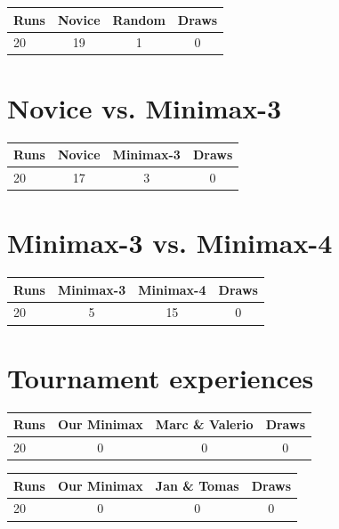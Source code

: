 \documentclass{scrartcl}
\begin{document}
\begin{tabular}{l c c c}
Runs & Novice & Random & Draws \\
\hline
20 & 19 & 1 & 0  \\
\end{tabular}

\section{Novice vs. Minimax-3}

\begin{tabular}{l c c c}
Runs & Novice & Minimax-3 & Draws \\
\hline
20 & 17 & 3 & 0  \\
\end{tabular}

\section{Minimax-3 vs. Minimax-4}

\begin{tabular}{l c c c}
Runs & Minimax-3 & Minimax-4 & Draws \\
\hline
20 & 5 & 15 & 0  \\
\end{tabular}

\section{Tournament experiences}

\begin{tabular}{l c c c}
Runs & Our Minimax & Marc \& Valerio & Draws \\
\hline
20 & 0 & 0 & 0  \\
\end{tabular}

\begin{tabular}{l c c c}
Runs & Our Minimax & Jan \& Tomas & Draws \\
\hline
20 & 0 & 0 & 0  \\
\end{tabular}
\end{document}
